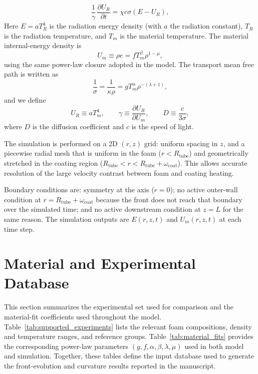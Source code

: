 \documentclass[11pt]{article}
\begin{document}
\begin{equation}
\frac{1}{\gamma}\,\frac{\partial U_R}{\partial t}
=
\chi c\sigma(E - U_R),
\label{eq:U_continuous}
\end{equation}
Here $E=aT_R^4$ is the radiation energy density (with $a$ the radiation constant), $T_R$ is the radiation temperature, and $T_m$ is the material temperature. The material internal-energy density is
\begin{equation}
U_m\equiv \rho e = fT_m^{\beta}\rho^{1-\mu},
\end{equation}
using the same power-law closure adopted in the model. The transport mean free path is written as
\begin{equation}
\frac{1}{\sigma}=\frac{1}{\kappa\rho}=gT_m^{\alpha}\rho^{-(\lambda+1)},
\end{equation}
and we define
\begin{equation}
U_R\equiv aT_m^4,
\qquad
\gamma\equiv\frac{\partial U_R}{\partial U_m},
\qquad
D\equiv\frac{c}{3\sigma},
\end{equation}
where $D$ is the diffusion coefficient and $c$ is the speed of light.

The simulation is performed on a 2D $(r,z)$ grid: uniform spacing in $z$, and a piecewise radial mesh that is uniform in the foam ($r<R_{\mathrm{tube}}$) and geometrically stretched in the coating region ($R_{\mathrm{tube}}<r<R_{\mathrm{tube}}+\omega_{\mathrm{coat}}$). This allows accurate resolution of the large velocity contrast between foam and coating heating.

Boundary conditions are: symmetry at the axis ($r=0$); no active outer-wall condition at $r=R_{\mathrm{tube}}+\omega_{\mathrm{coat}}$ because the front does not reach that boundary over the simulated time; and no active downstream condition at $z=L$ for the same reason. The simulation outputs are $E(r,z,t)$ and $U_m(r,z,t)$ at each time step.

\section{Material and Experimental Database}
This section summarizes the experimental set used for comparison and the material-fit coefficients used throughout the model. Table~\ref{tab:supported_experiments} lists the relevant foam compositions, density and temperature ranges, and reference groups. Table~\ref{tab:material_fits} provides the corresponding power-law parameters $\left(g,f,\alpha,\beta,\lambda,\mu\right)$ used in both model and simulation. Together, these tables define the input database used to generate the front-evolution and curvature results reported in the manuscript.
\end{document}
